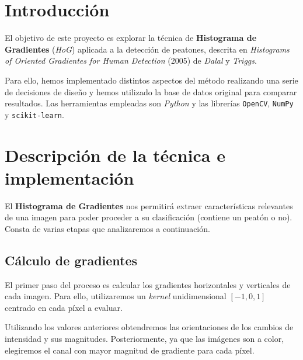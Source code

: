 \documentclass[11pt,a4paper]{article}
\begin{document}
    \tableofcontents
    \listoffigures

\newpage

    \section{Introducción}

        \par
        El objetivo de este proyecto es explorar la técnica de \textbf{Histograma de Gradientes} (\textit{HoG}) aplicada a la detección de peatones, descrita en \textit{Histograms of Oriented Gradientes for Human Detection} (2005) de \textit{Dalal} y \textit{Triggs}.

        \par
        Para ello, hemos implementado distintos aspectos del método realizando una serie de decisiones de diseño y hemos utilizado la base de datos original para comparar resultados. Las herramientas empleadas son \textit{Python} y las librerías \texttt{OpenCV}, \texttt{NumPy} y \texttt{scikit-learn}.

    \section{Descripción de la técnica e implementación}

        \par
        El \textbf{Histograma de Gradientes} nos permitirá extraer características relevantes de una imagen para poder proceder a su clasificación (contiene un peatón o no). Consta de varias etapas que analizaremos a continuación.

        \subsection{Cálculo de gradientes}

            \par
            El primer paso del proceso es calcular los gradientes horizontales y verticales de cada imagen. Para ello, utilizaremos un \textit{kernel} unidimensional $\left[-1,0,1\right]$ centrado en cada píxel a evaluar.

            \par
            Utilizando los valores anteriores obtendremos las orientaciones de los cambios de intensidad y sus magnitudes. Posteriormente, ya que las imágenes son a color, elegiremos el canal con mayor magnitud de gradiente para cada píxel.
\end{document}

